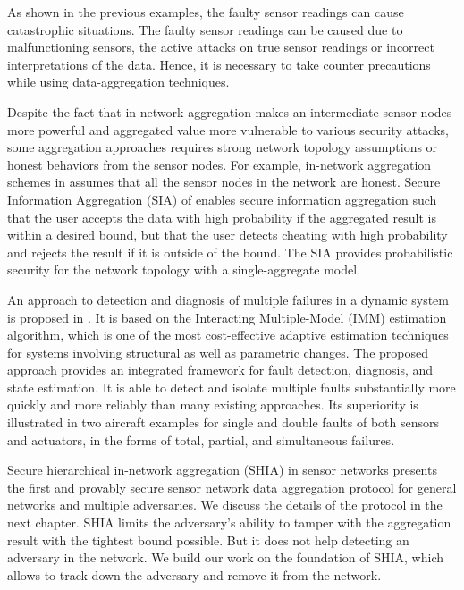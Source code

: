 	As shown in the previous examples, the faulty sensor readings can cause catastrophic situations. 
	The faulty sensor readings can be caused due to malfunctioning sensors, the active attacks on true sensor readings or incorrect interpretations of the data.
	Hence, it is necessary to take counter precautions while using data-aggregation techniques.
	
	Despite the fact that in-network aggregation makes an intermediate sensor nodes more powerful and aggregated value more vulnerable to various security attacks, some aggregation approaches requires strong network topology assumptions or honest behaviors from the sensor nodes.
	For example, in-network aggregation schemes in \cite{yao2002cougar, madden2003design} assumes that all the sensor nodes in the network are honest. 
	Secure Information Aggregation (SIA) of \cite{przydatek2003sia} enables secure information aggregation such that the user accepts the data with high probability if the aggregated result is within a desired bound, but that the user detects cheating with high probability and rejects the result if it is outside of the bound.
	The SIA provides probabilistic security for the network topology with a single-aggregate model.

	An approach to detection and diagnosis of multiple failures in a dynamic system is proposed in \cite{zhang1998detection}. 
	It is based on the Interacting Multiple-Model (IMM) estimation algorithm, which is one of the most cost-effective adaptive estimation techniques for systems involving structural as well as parametric changes. 
	The proposed approach provides an integrated framework for fault detection, diagnosis, and state estimation. 
	It is able to detect and isolate multiple faults substantially more quickly and more reliably than many existing approaches. 
	Its superiority is illustrated in two aircraft examples for single and double faults of both sensors and actuators, in the forms of total, partial, and simultaneous failures. 

	Secure hierarchical in-network aggregation (SHIA) in sensor networks \cite{chan2006secure} presents the first and provably secure sensor network data aggregation protocol for general networks and multiple adversaries. 
	We discuss the details of the protocol in the next chapter. 
	SHIA limits the adversary's ability to tamper with the aggregation result with the tightest bound possible.
	But it does not help detecting an adversary in the network.
	We build our work on the foundation of SHIA, which allows to track down the adversary and remove it from the network.